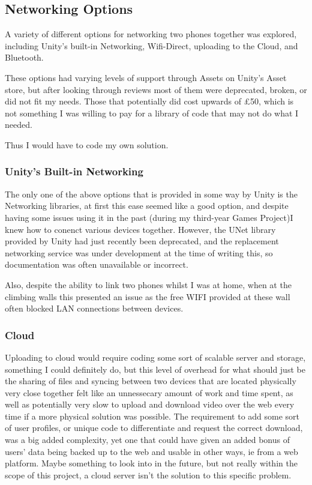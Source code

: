 \subsection{Networking Options}
A variety of different options for networking two phones together was explored, including Unity's built-in Networking, Wifi-Direct, uploading to the Cloud, and Bluetooth.


These options had varying levels of support through Assets on Unity's Asset store, but after looking through reviews most of them were deprecated, broken, or did not fit my needs.
Those that potentially did cost upwards of £50, which is not something I was willing to pay for a library of code that may not do what I needed.

Thus I would have to code my own solution.

\subsubsection{Unity's Built-in Networking}
The only one of the above options that is provided in some way by Unity is the Networking libraries, at first this ease seemed like a good option, and despite having some issues using it in the past (during my third-year Games Project)I knew how to conenct various devices together.
However, the UNet library provided by Unity had just recently been deprecated, and the replacement networking service was under development at the time of writing this, so documentation was often unavailable or incorrect.

Also, despite the ability to link two phones whilst I was at home, when at the climbing walls this presented an issue as the free WIFI provided at these wall often blocked LAN connections between devices.

\subsubsection{Cloud}
Uploading to cloud would require coding some sort of scalable server and storage, something I could definitely do, but this level of overhead for what should just be the sharing of files and syncing between two devices that are located physically very close together felt like an unnessecary amount of work and time spent, as well as potentially very slow to upload and download video over the web every time if a more physical solution was possible.
The requirement to add some sort of user profiles, or unique code to differentiate and request the correct download, was a big added complexity, yet one that could have given an added bonus of users' data being backed up to the web and usable in other ways, ie from a web platform.
Maybe something to look into in the future, but not really within the scope of this project, a cloud server isn't the solution to this specific problem.

